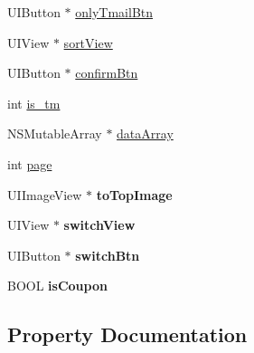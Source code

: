 \begin{DoxyCompactItemize}
\item 
U\+I\+Button $\ast$ \mbox{\hyperlink{category_product_list_view_controller_07_08_a56a78dff9e3584c1ccf445a988b2d30a}{only\+Tmail\+Btn}}
\item 
U\+I\+View $\ast$ \mbox{\hyperlink{category_product_list_view_controller_07_08_a84f046712ec22ca57fbed15050e288ae}{sort\+View}}
\item 
U\+I\+Button $\ast$ \mbox{\hyperlink{category_product_list_view_controller_07_08_a9c9b2d71fc44ab8aab46f679f9224e1d}{confirm\+Btn}}
\item 
int \mbox{\hyperlink{category_product_list_view_controller_07_08_a4e8587fad9d46ce8683a13409cf1d751}{is\+\_\+tm}}
\item 
N\+S\+Mutable\+Array $\ast$ \mbox{\hyperlink{category_product_list_view_controller_07_08_ae0e65142a026ed1ab906861cd2979d89}{data\+Array}}
\item 
int \mbox{\hyperlink{category_product_list_view_controller_07_08_a2a13a98bfa47aea2b71883ca47c2da3c}{page}}
\item 
\mbox{\label{category_product_list_view_controller_07_08_af390a53f29730df7de77f394afd1df22}} 
U\+I\+Image\+View $\ast$ {\bfseries to\+Top\+Image}
\item 
\mbox{\label{category_product_list_view_controller_07_08_a7c9332565a4122c04989a36df5ef2e72}} 
U\+I\+View $\ast$ {\bfseries switch\+View}
\item 
\mbox{\label{category_product_list_view_controller_07_08_a46a59435222fa2ab76736f285ee464c4}} 
U\+I\+Button $\ast$ {\bfseries switch\+Btn}
\item 
\mbox{\label{category_product_list_view_controller_07_08_a3f5e5d40174ea3fae25503193b23cfe2}} 
B\+O\+OL {\bfseries is\+Coupon}
\end{DoxyCompactItemize}


\subsection{Property Documentation}
\mbox{\label{category_product_list_view_controller_07_08_a6ef60515ff4a46c5f4cd7f74b000ae94}} 
